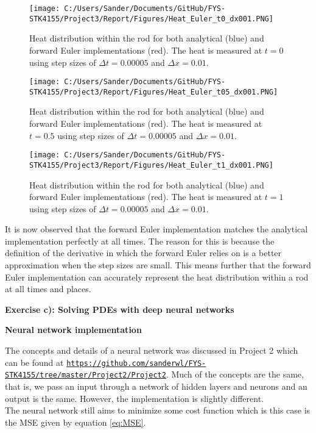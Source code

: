 \documentclass[12pt,a4paper]{article}
\begin{document}
\begin{figure}[H]
\centering
\texttt{[image: C:/Users/Sander/Documents/GitHub/FYS-STK4155/Project3/Report/Figures/Heat\_Euler\_t0\_dx001.PNG]}
\caption{\label{fig:rodHeatEulerT0DX001} Heat distribution within the rod for both analytical (blue) and forward Euler implementations (red). The heat is measured at $t = 0$ using step sizes of $\Delta t = 0.00005$ and $\Delta x = 0.01$.}
\end{figure}

\begin{figure}[H]
\centering
\texttt{[image: C:/Users/Sander/Documents/GitHub/FYS-STK4155/Project3/Report/Figures/Heat\_Euler\_t05\_dx001.PNG]}
\caption{\label{fig:rodHeatEulerT05DX001} Heat distribution within the rod for both analytical (blue) and forward Euler implementations (red). The heat is measured at $t = 0.5$ using step sizes of $\Delta t = 0.00005$ and $\Delta x = 0.01$.}
\end{figure}

\begin{figure}[H]
\centering
\texttt{[image: C:/Users/Sander/Documents/GitHub/FYS-STK4155/Project3/Report/Figures/Heat\_Euler\_t1\_dx001.PNG]}
\caption{\label{fig:rodHeatEulerT1DX001} Heat distribution within the rod for both analytical (blue) and forward Euler implementations (red). The heat is measured at $t = 1$ using step sizes of $\Delta t = 0.00005$ and $\Delta x = 0.01$.}
\end{figure}

\noindent It is now observed that the forward Euler implementation matches the analytical implementation perfectly at all times. The reason for this is because the definition of the derivative in which the forward Euler relies on is a better approximation when the step sizes are small. This means further that the forward Euler implementation can accurately represent the heat distribution within a rod at all times and places.

\newpage

\begin{center}
\Large{\textbf{Exercise c): Solving PDEs with deep neural networks}}
\end{center}

\begin{center}
\large{\textbf{Neural network implementation}}
\end{center}

\noindent The concepts and details of a neural network was discussed in Project 2 which can be found at \href{{https://github.com/sanderwl/FYS-STK4155/tree/master/Project2/Project2}}{\nolinkurl{https://github.com/sanderwl/FYS-STK4155/tree/master/Project2/Project2}}. Much of the concepts are the same, that is, we pass an input through a network of hidden layers and neurons and an output is the same. However, the implementation is slightly different. 
\\
The neural network still aims to minimize some cost function which is this case is the MSE given by equation \ref{eq:MSE}.
\end{document}
